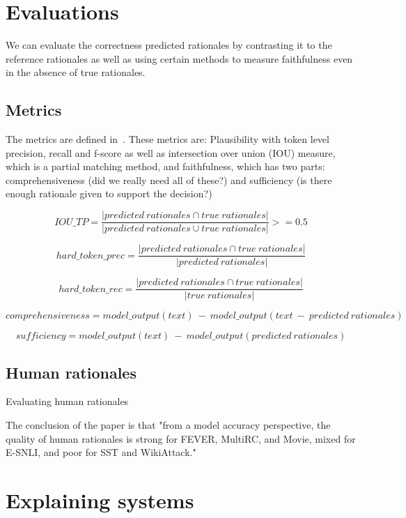 \documentclass[]{article}
\begin{document}
\clearpage

\section{Evaluations}

We can evaluate the correctness predicted rationales by contrasting it to the reference rationales as well as using certain methods to measure faithfulness even in the absence of true rationales.

\subsection{Metrics}

The metrics are defined in~\cite{DeYoung:2020}. These metrics are: Plausibility with token level precision, recall and f-score as well as intersection over union (IOU) measure, which is a partial matching method, and faithfulness, which has two parts: comprehensiveness (did we really need all of these?) and sufficiency (is there enough rationale given to support the decision?)

\[IOU\_TP = \frac{|predicted\ rationales \cap true\ rationales|}{|predicted\ rationales \cup true\ rationales|} >= 0.5\]

\[hard\_token\_prec = \frac{|predicted\ rationales \cap true\ rationales|}{|predicted\ rationales|}\]

\[hard\_token\_rec = \frac{|predicted\ rationales \cap true\ rationales|}{|true\ rationales|}\]

\[comprehensiveness = model\_output(text)\ -\ model\_output(text\ -\ predicted\ rationales) \]

\[sufficiency = model\_output(text)\ -\ model\_output(predicted\ rationales)\]

\subsection{Human rationales}

Evaluating human rationales \cite{Carton:2020}

The conclusion of the paper is that "from a model accuracy perspective, the quality of human rationales is strong for FEVER, MultiRC, and Movie, mixed for E-SNLI, and poor for SST and WikiAttack."

\section{Explaining systems}
\end{document}
